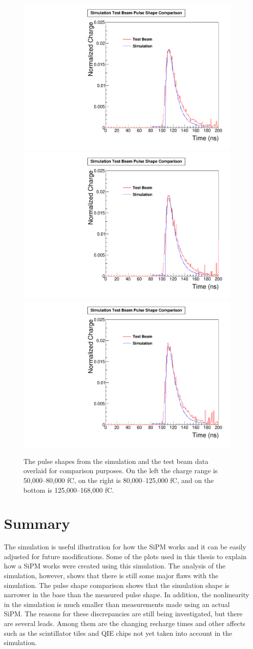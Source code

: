 \begin{figure}
\centering
\includegraphics[width=0.495\linewidth]{Figures/50Comparison.pdf}
\includegraphics[width=0.495\linewidth]{Figures/80Comparison.pdf}
\includegraphics[width=0.495\linewidth]{Figures/125Comparison.pdf}
\caption{The pulse shapes from the simulation and the test beam data overlaid for comparison purposes. On the left the charge range is 50,000--80,000 fC, on the right is 80,000--125,000 fC, and on the bottom is 125,000--168,000 fC.}
\label{fig:2comparison_together}
\end{figure}

\section{Summary}

The simulation is useful illustration for how the SiPM works and it can be easily adjusted for future modifications. Some of the plots used in this thesis to explain how a SiPM works were created using this simulation. The analysis of the simulation, however, shows that there is still some major flaws with the simulation. The pulse shape comparison shows that the simulation shape is narrower in the base than the measured pulse shape. In addition, the nonlinearity in the simulation is much smaller than measurements made using an actual SiPM. The reasons for these discrepancies are still being investigated, but there are several leads. Among them are the changing recharge times and other affects such as the scintillator tiles and QIE chips not yet taken into account in the simulation. 
